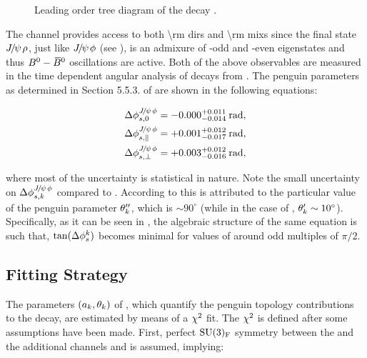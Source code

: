 \begin{figure}[h]
  \centering
  \scalebox{0.9}{\sffamily }
  \caption{Leading order tree diagram of the decay \BdJpsiRho.}
  \label{bs2jpsirho_diagram}
\end{figure}

The \BdJpsiRho channel provides access to both \Acp{\rm dir} and \Acp{\rm mix} since the final state
${J\mskip -3mu/\mskip -2mu\psi\mskip 2mu}\rho$, just like ${J\mskip -3mu/\mskip -2mu\psi\mskip 2mu}\phi$ (see ), is an admixure of \CP-odd and \CP-even
eigenstates and thus $B^0-\kern 0.18em\overline{\kern -0.18em B}{}^0$ oscillations are active. Both of the above observables are measured
in the time dependent angular analysis of \BdJpsipipi decays from \lhcb \cite{Aaij:2014vda}. The penguin
parameters as determined in Section 5.5.3. of \cite{DeBruyn-thesis} are shown in the following equations:

\begin{subequations}
  \label{delta_phis_jpsirho}
  \begin{align}
    \Delta\phi^{{J\mskip -3mu/\mskip -2mu\psi\mskip 2mu}\phi}_{s,{0}}         & = -0.000^{+0.011}_{-0.014}\:\text{rad},\\
    \Delta\phi^{{J\mskip -3mu/\mskip -2mu\psi\mskip 2mu}\phi}_{s,{\parallel}} & = +0.001^{+0.012}_{-0.017}\:\text{rad},\\
    \Delta\phi^{{J\mskip -3mu/\mskip -2mu\psi\mskip 2mu}\phi}_{s,{\perp}}     & = +0.003^{+0.012}_{-0.016}\:\text{rad},
  \end{align}
\end{subequations}

\noindent where most of the uncertainty is statistical in nature. Note the small uncertainty on
$\Delta\phi^{{J\mskip -3mu/\mskip -2mu\psi\mskip 2mu}\phi}_{s,{k}}$ compared to . According to \cite{DeBruyn:2014oga,DeBruyn-thesis}
this is attributed to the particular value of the penguin parameter $\theta_k''$, which is
$\sim 90^\circ$ (while in the case of \BsJpsiKst, $\theta_k' \sim 10^\circ$).
Specifically, as it can be seen in , the algebraic structure of the
same equation is such that, $\tan(\Delta\phi_{s}^k)$ becomes minimal for values of \thkPeng{}
around odd multiples of $\pi/2$.

\subsection{Fitting Strategy}
\label{penguin_chi2_fit}

The parameters $(a_k,\theta_k)$ of , which quantify the penguin topology contributions
to the \BsJpsiPhi decay, are estimated by means of a $\chi^2$ fit. The $\chi^2$ is defined after some assumptions have
been made. First, perfect $\mathrm{SU}(3)_{\rm F}$ symmetry between the \BsJpsiPhi and the additional channels \BsJpsiKst
and \BdJpsiRho is assumed, implying:

